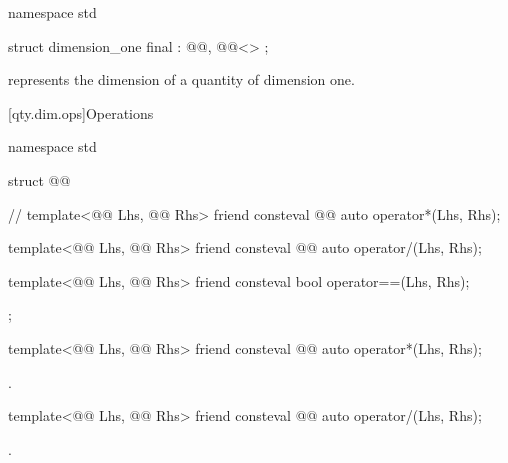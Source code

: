 \begin{codeblock}
namespace std {

struct dimension_one final : @@, @@<> {};

}
\end{codeblock}

\pnum
{} represents the dimension of a quantity of dimension one.

[qty.dim.ops]{Operations}

\begin{codeblock}
namespace std {

struct @@ {  // \expos
  template<@@ Lhs, @@ Rhs>
  friend consteval @@ auto operator*(Lhs, Rhs);

  template<@@ Lhs, @@ Rhs>
  friend consteval @@ auto operator/(Lhs, Rhs);

  template<@@ Lhs, @@ Rhs>
  friend consteval bool operator==(Lhs, Rhs);
};

}
\end{codeblock}

\begin{itemdecl}
template<@@ Lhs, @@ Rhs>
friend consteval @@ auto operator*(Lhs, Rhs);
\end{itemdecl}

\begin{itemdescr}
\pnum
\returns
{}.
\end{itemdescr}

\begin{itemdecl}
template<@@ Lhs, @@ Rhs>
friend consteval @@ auto operator/(Lhs, Rhs);
\end{itemdecl}

\begin{itemdescr}
\pnum
\returns
{}.
\end{itemdescr}

